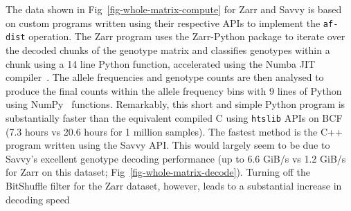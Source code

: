 \documentclass[a4paper,num-refs]{oup-contemporary}
\begin{document}
The data shown in Fig~\ref{fig-whole-matrix-compute} for Zarr and Savvy
is based on custom programs written using their respective APIs
to implement the \texttt{af-dist} operation. The Zarr program uses
the Zarr-Python package to iterate over the decoded chunks of the
genotype matrix and classifies genotypes within a chunk using a 14 line Python
function, accelerated using the Numba JIT compiler~\cite{lam2015numba}.
The allele frequencies and genotype counts are then analysed to produce
the final counts within the allele frequency bins with 9 lines of
Python using NumPy~\cite{harris2020array} functions. Remarkably, this
short and simple Python program is substantially faster than the
equivalent compiled C using \texttt{htslib} APIs on BCF (7.3 hours
vs 20.6 hours for 1 million samples).
The fastest method is the
C++ program written using the Savvy API. This would largely seem
to be due to Savvy's excellent genotype decoding performance
(up to 6.6 GiB/s vs 1.2 GiB/s for Zarr on this dataset;
Fig~\ref{fig-whole-matrix-decode}).
Turning off the BitShuffle filter for the Zarr dataset,
however, leads to a substantial increase in decoding speed
\end{document}
